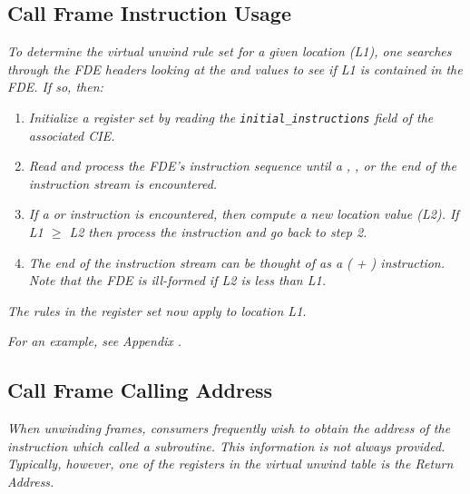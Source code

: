 \subsection{Call Frame Instruction Usage} 
\label{chap:callframeinstructionusage}

\textit{To determine the virtual unwind rule set for a given location
(L1), one searches through the FDE headers looking at the
 and  values to see if L1 is
contained in the FDE. If so, then:}
\begin{enumerate}[1. ]

\item \textit{Initialize a register set by reading the
\texttt{initial\_instructions} field of the associated CIE.}

\item \textit{Read and process the FDE\textquoteright s instruction
sequence until a \DWCFAadvanceloc, 
\DWCFAsetloc, or the
end of the instruction stream is encountered.}

\item \textit{ If a \DWCFAadvanceloc{} or \DWCFAsetloc{}
instruction is encountered, then compute a new location value
(L2). If L1 $\geq$ L2 then process the instruction and go back
to step 2.}

\item \textit{ The end of the instruction stream can be thought
of as a \DWCFAsetloc{} ( + )
instruction. Note that the FDE is ill-formed if L2 is less
than L1.}

\end{enumerate}

\textit{The rules in the register set now apply to location L1.}

\textit{For an example, see 
Appendix .}



\subsection{Call Frame Calling Address}
\label{chap:callframecallingaddress}

\textit{When unwinding frames, consumers frequently wish to obtain the
address of the instruction which called a subroutine. This
information is not always provided. Typically, however,
one of the registers in the virtual unwind table is the
Return Address.}

